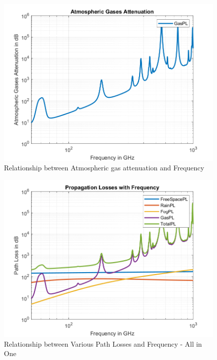 \documentclass[a4paper,11pt]{article}%
\begin{document}
\begin{figure}[!h]
	\centering
	\includegraphics[scale=0.75]{code/GasPL.png}
	\caption{Relationship between Atmospheric gas attenuation and Frequency}
\end{figure}

\begin{figure}[!h]
	\centering
	\includegraphics[scale=0.75]{code/AllinOne.png}
	\caption{Relationship between Various Path Losses and Frequency - All in One}
\end{figure}
\end{document}
